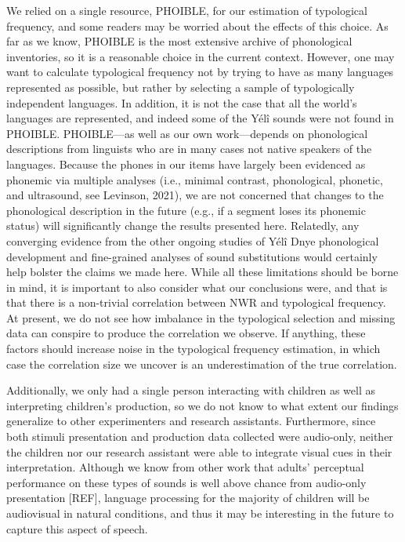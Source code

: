 \documentclass[
  american,
  ,man,floatsintext]{apa6}
\begin{document}
We relied on a single resource, PHOIBLE, for our estimation of typological frequency, and some readers may be worried about the effects of this choice. As far as we know, PHOIBLE is the most extensive archive of phonological inventories, so it is a reasonable choice in the current context. However, one may want to calculate typological frequency not by trying to have as many languages represented as possible, but rather by selecting a sample of typologically independent languages. In addition, it is not the case that all the world's languages are represented, and indeed some of the Yélî sounds were not found in PHOIBLE. PHOIBLE---as well as our own work---depends on phonological descriptions from linguists who are in many cases not native speakers of the languages. Because the phones in our items have largely been evidenced as phonemic via multiple analyses (i.e., minimal contrast, phonological, phonetic, and ultrasound, see Levinson, 2021), we are not concerned that changes to the phonological description in the future (e.g., if a segment loses its phonemic status) will significantly change the results presented here. Relatedly, any converging evidence from the other ongoing studies of Yélî Dnye phonological development and fine-grained analyses of sound substitutions would certainly help bolster the claims we made here. While all these limitations should be borne in mind, it is important to also consider what our conclusions were, and that is that there is a non-trivial correlation between NWR and typological frequency. At present, we do not see how imbalance in the typological selection and missing data can conspire to produce the correlation we observe. If anything, these factors should increase noise in the typological frequency estimation, in which case the correlation size we uncover is an underestimation of the true correlation.

Additionally, we only had a single person interacting with children as well as interpreting children's production, so we do not know to what extent our findings generalize to other experimenters and research assistants. Furthermore, since both stimuli presentation and production data collected were audio-only, neither the children nor our research assistant were able to integrate visual cues in their interpretation. Although we know from other work that adults' perceptual performance on these types of sounds is well above chance from audio-only presentation {[}REF{]}, language processing for the majority of children will be audiovisual in natural conditions, and thus it may be interesting in the future to capture this aspect of speech.
\end{document}
